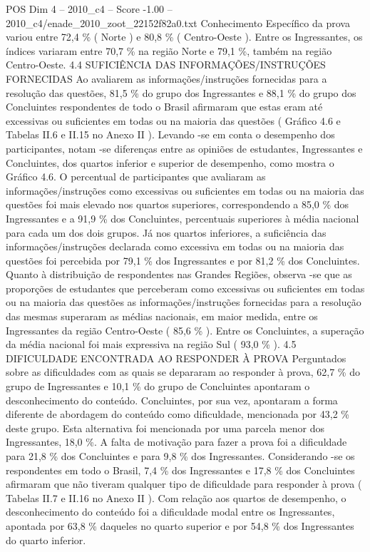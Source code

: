 \begin{textsample}{POS Dim 4 – 2010\_c4 – Score -1.00 – 2010\_c4/enade\_2010\_zoot\_22152f82a0.txt}
Conhecimento Específico da prova variou entre 72,4 \% ( Norte ) e 80,8 \% ( Centro-Oeste ).
Entre os Ingressantes, os índices variaram entre 70,7 \% na região Norte e 79,1 \%, também na região Centro-Oeste. 4.4 SUFICIÊNCIA DAS INFORMAÇÕES/INSTRUÇÕES FORNECIDAS Ao avaliarem as informações/instruções fornecidas para a resolução das questões, 81,5 \% do grupo dos Ingressantes e 88,1 \% do grupo dos Concluintes respondentes de todo o Brasil afirmaram que estas eram até excessivas ou suficientes em todas ou na maioria das questões ( Gráfico 4.6 e Tabelas II.6 e II.15 no Anexo II ).
Levando -se em conta o desempenho dos participantes, notam -se diferenças entre as opiniões de estudantes, Ingressantes e Concluintes, dos quartos inferior e superior de desempenho, como mostra o Gráfico 4.6.
O percentual de participantes que avaliaram as informações/instruções como excessivas ou suficientes em todas ou na maioria das questões foi mais elevado nos quartos superiores, correspondendo a 85,0 \% dos Ingressantes e a 91,9 \% dos Concluintes, percentuais superiores à média nacional para cada um dos dois grupos.
Já nos quartos inferiores, a suficiência das informações/instruções declarada como excessiva em todas ou na maioria das questões foi percebida por 79,1 \% dos Ingressantes e por 81,2 \% dos Concluintes.
Quanto à distribuição de respondentes nas Grandes Regiões, observa -se que as proporções de estudantes que perceberam como excessivas ou suficientes em todas ou na maioria das questões as informações/instruções fornecidas para a resolução das mesmas superaram as médias nacionais, em maior medida, entre os Ingressantes da região Centro-Oeste ( 85,6 \% ).
Entre os Concluintes, a superação da média nacional foi mais expressiva na região Sul ( 93,0 \% ). 4.5 DIFICULDADE ENCONTRADA AO RESPONDER À PROVA Perguntados sobre as dificuldades com as quais se depararam ao responder à prova, 62,7 \% do grupo de Ingressantes e 10,1 \% do grupo de Concluintes apontaram o desconhecimento do conteúdo.
Concluintes, por sua vez, apontaram a forma diferente de abordagem do conteúdo como dificuldade, mencionada por 43,2 \% deste grupo.
Esta alternativa foi mencionada por uma parcela menor dos Ingressantes, 18,0 \%.
A falta de motivação para fazer a prova foi a dificuldade para 21,8 \% dos Concluintes e para 9,8 \% dos Ingressantes.
Considerando -se os respondentes em todo o Brasil, 7,4 \% dos Ingressantes e 17,8 \% dos Concluintes afirmaram que não tiveram qualquer tipo de dificuldade para responder à prova ( Tabelas II.7 e II.16 no Anexo II ).
Com relação aos quartos de desempenho, o desconhecimento do conteúdo foi a dificuldade modal entre os Ingressantes, apontada por 63,8 \% daqueles no quarto superior e por 54,8 \% dos Ingressantes do quarto inferior.

\end{textsample}
